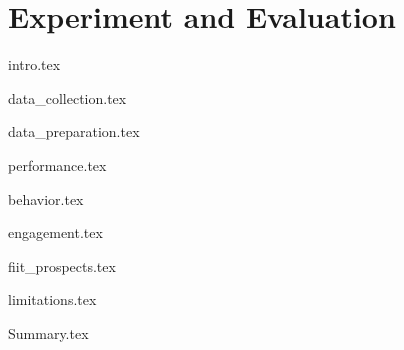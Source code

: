 \chapter{Experiment and Evaluation \label{cha:eva}}

{intro.tex}

{data_collection.tex}

{data_preparation.tex}





{performance.tex}

{behavior.tex}

{engagement.tex}

{fiit_prospects.tex}








{limitations.tex}

{Summary.tex}
